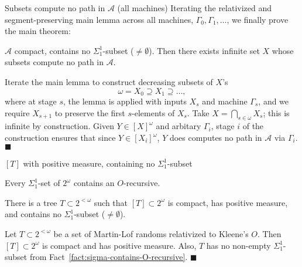 \begin{frame}{Subsets compute no path in $\mathcal{A}$ (all machines)}
  Iterating the relativized and segment-preserving main lemma across all
  machines, $\Gamma_0,\Gamma_1,\ldots$, we finally prove the main theorem:
  \begin{main-thm*}
    $\mathcal{A}$ compact, contains no $\Sigma_1^1$-subset
    ($\neq\emptyset$). Then there exists infinite set $X$ whose subsets
    compute no path in $\mathcal{A}$.
  \end{main-thm*}

  Iterate the main lemma to construct decreasing subsets of $X$'s
  \[\omega= X_0\supseteq X_1\supseteq\ldots,\]
  where at stage $s$, the lemma is applied with inputs $X_s$ and machine
  $\Gamma_s$, and we require $X_{s+1}$ to preserve the first $s$-elements
  of $X_s$. Take $X=\bigcap_{s\in\omega}X_s$; this is infinite by
  construction. Given $Y\in[X]^\omega$ and arbitary $\Gamma_i$, stage $i$
  of the construction ensures that since $Y\in[X_i]^\omega$, $Y$ does
  computes no path in $\mathcal{A}$ via $\Gamma_i$. $\blacksquare$
\end{frame}

\begin{frame}{$[T]$ with positive measure, containing no
$\Sigma_1^1$-subset}
  \begin{fact}
    \label{fact:sigma-contains-O-recursive}
    Every $\Sigma_1^1$-set of $2^\omega$ contains an $O$-recursive.
  \end{fact}

  \begin{thm}
    There is a tree $T\subset2^{<\omega}$ such that $[T]\subset
    2^\omega$ is compact, has positive measure, and contains no
    $\Sigma_1^1$-subset ($\neq\emptyset$).
  \end{thm}

  \vspace{1em}
  Let $T\subset2^{<\omega}$ be a set of Martin-Lof randoms relativized to
  Kleene's $O$. Then $[T]\subset 2^\omega$ is compact and has positive
  measure. Also, $T$ has no non-empty $\Sigma_1^1$-subset from
  Fact~\ref{fact:sigma-contains-O-recursive}. $\blacksquare$
\end{frame}

